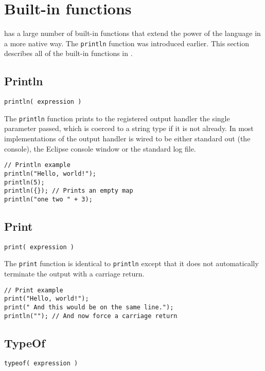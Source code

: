 



\chapter{Built-in functions}
\Reflex has a large number of built-in functions that extend the power of the language in a more native way. The \Verb+println+ function was introduced earlier. This section describes all of the built-in functions in \Reflex.

\section{Println}
\begin{Verbatim}
println( expression )
\end{Verbatim}

The \Verb+println+ function prints to the registered output handler the single parameter passed, which is coerced to a string type if it is not already. In most implementations of \Reflex the output handler is wired to be either standard out (the console), the Eclipse console window or the standard log file.
\begin{lstlisting}[caption={println}]
// Println example
println("Hello, world!");
println(5);
println({}); // Prints an empty map
println("one two " + 3);
\end{lstlisting}

\section{Print}
\begin{Verbatim}
print( expression )
\end{Verbatim}

The \Verb+print+ function is identical to \verb+println+ except that it does not automatically terminate the output with a carriage return.
\begin{lstlisting}[caption={print}]
// Print example
print("Hello, world!");
print(" And this would be on the same line.");
println(""); // And now force a carriage return
\end{lstlisting}

\section{TypeOf}

\begin{Verbatim}
typeof( expression )
\end{Verbatim}

